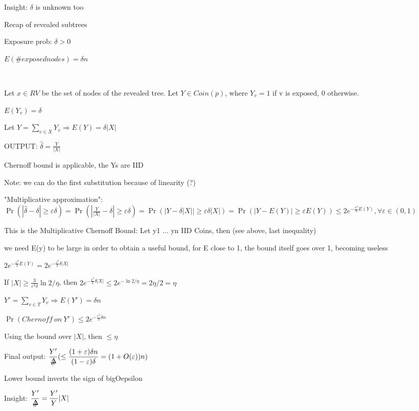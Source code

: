 \documentclass{report}
\begin{document}
	Insight: $\delta$ is unknown too
	
	Recap of revealed subtrees
	
	Exposure prob: $\delta > 0$
	
	$E(\# exposed nodes) = \delta n$
	
	\
	
	Let $x \in RV$ be the set of nodes of the revealed tree. Let $Y \in Coin(p)$, where $Y_v = 1$ if v is exposed, 0 otherwise.
	
	$E(Y_v) = \delta$
	
	Let $ Y = \sum_{v \in X} Y_v \Rightarrow E(Y)= \delta |X|$
	
	OUTPUT: $\hat\delta = \frac{Y}{|X|}$
	
	Chernoff bound is applicable, the Ys are IID
	
	Note: we can do the first substitution because of linearity (?)
	
	"Multiplicative approximation": $\displaystyle \Pr(|\hat\delta - \delta| \geq \varepsilon \delta) = \Pr(|\frac{Y}{|X|} - \delta| \geq \varepsilon \delta) = \Pr(|Y - \delta |X|| \geq \varepsilon \delta |X|) = \Pr(|Y - E(Y)| \geq \varepsilon E(Y)) \leq 2e^{-\frac{\varepsilon^2}{3}E(Y)}, \forall \varepsilon \in (0, 1)$
	
	This is the Multiplicative Chernoff Bound: Let y1 ... yn IID Coins, then (see above, last inequality)
	
	we need E(y) to be large in order to obtain a useful bound, for E close to 1, the bound itself goes over 1, becoming useless
	
	$\displaystyle 2e^{-\frac{\varepsilon^2}{3}E(Y)} = 2e^{-\frac{\varepsilon^2}{3}\delta|X|}$
	
	If $\displaystyle |X| \geq \frac{3}{\varepsilon^2\delta}\ln2/\eta$, then $\displaystyle 2e^{-\frac{\varepsilon^2}{3}\delta|X|} \leq 2e^{-\ln2/\eta} = 2\eta/2 = \eta$
	
	$Y' = \sum_{v \in T}Y_v \Rightarrow E(Y') = \delta n$
	
	$\Pr(Chernoff\ on\ Y') \leq 2e^{-\frac{\varepsilon^2}{3}\delta n}$
	
	Using the bound over $|X|$, then $\leq \eta$
	
	Final output: $\displaystyle \frac{Y'}{\mathaccent 1 \delta } (\leq  \frac{(1 + \varepsilon)\delta n}{(1 - \varepsilon)\delta} = (1+O(\varepsilon))n )$
	
	Lower bound inverts the sign of bigOepsilon
	
	Insight: $\displaystyle \frac{Y'}{\mathaccent 1 \delta } = \frac{Y'}{Y}|X|$
	
\end{document}

